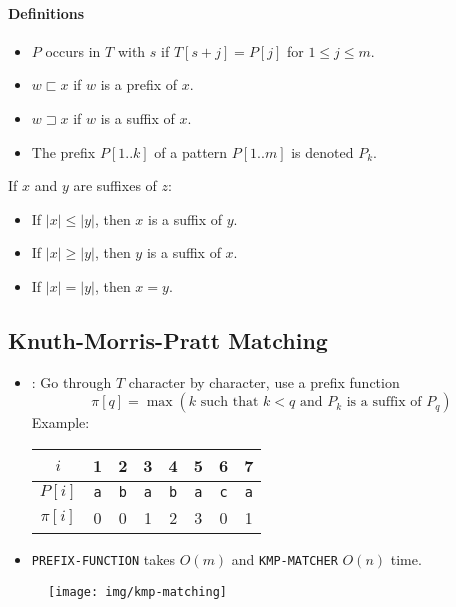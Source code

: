 \documentclass[twocolumn,english]{article}
\providecommand{\tabularnewline}{\\}
\numberwithin{equation}{section}
\numberwithin{figure}{section}
\numberwithin{table}{section}
\providecommand{\tabularnewline}{\\}
\let\emph\relax
\begin{document}
\paragraph{Definitions}
\begin{itemize}
\item $P$ occurs in $T$ with \emph{shift} $s$ if $T\left[s+j\right]=P\left[j\right]$
for $1\leq j\leq m$.
\item $w\sqsubset x$ if $w$ is a prefix of $x$.
\item $w\sqsupset x$ if $w$ is a suffix of $x$.
\item The prefix $P\left[1..k\right]$ of a pattern $P\left[1..m\right]$
is denoted $P_{k}$.
\end{itemize}
If $x$ and $y$ are suffixes of $z$:
\begin{itemize}
\item If $\left|x\right|\leq\left|y\right|$, then $x$ is a suffix of $y$.
\item If $\left|x\right|\geq\left|y\right|$, then $y$ is a suffix of $x$.
\item If $\left|x\right|=\left|y\right|$, then $x=y$.
\end{itemize}

\subsection{Knuth-Morris-Pratt Matching}
\begin{itemize}
\item \emph{Key Idea}: Go through $T$ character by character, use a prefix
function
\[
\pi\left[q\right]=\max\left(k\text{ such that }k<q\text{ and }P_{k}\text{ is a suffix of }P_{q}\right)
\]
Example:
\begin{table}[H]
\centering{}%
\begin{tabular}{cccccccc}
\toprule 
$i$ & 1 & 2 & 3 & 4 & 5 & 6 & 7\tabularnewline
\midrule
$P\left[i\right]$ & \texttt{a} & \texttt{b} & \texttt{a} & \texttt{b} & \texttt{a} & \texttt{c} & \texttt{a}\tabularnewline
$\pi\left[i\right]$ & 0 & 0 & 1 & 2 & 3 & 0 & 1\tabularnewline
\bottomrule
\end{tabular}
\end{table}
\item \texttt{PREFIX-FUNCTION} takes $O\left(m\right)$ and \texttt{KMP-MATCHER}
$O\left(n\right)$ time.
\end{itemize}
\begin{figure}[H]
\centering{}\texttt{[image: img/kmp-matching]}
\end{figure}
\end{document}
